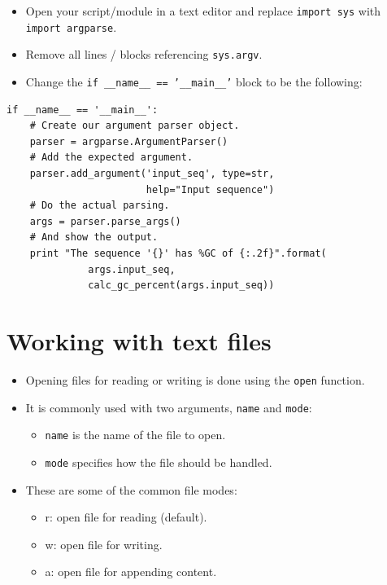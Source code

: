 \documentclass[aspectratio=1610,slidestop]{beamer}
\newenvironment{pythoncode}
 {\begin{tcolorbox}[title filled=false,
                    coltitle=LUMCDonkerblauw,
                    fonttitle=\scriptsize,
                    fontupper=\footnotesize,
                    enhanced,
                    drop small lifted shadow,
                    boxrule=0.1mm,
                    leftrule=5mm,
                    rulecolor=white,
                    left=0.1cm,
                    colback=white!92!black,
                    colframe=scriptback]}
 {\end{tcolorbox}}
\begin{document}
\begin{pframe}
 \vspace{-0.5cm}
 \begin{itemize}
  \item Open your script/module in a text editor and replace
  \texttt{import sys} with \texttt{import argparse}.
  \item Remove all lines / blocks referencing \texttt{sys.argv}.
  \item Change the \texttt{if __name__ == '__main__'} block to be
  the following:
 \end{itemize}
 \vspace{-0.3cm}
 \begin{pythoncode}
  \begin{verbatim}
if __name__ == '__main__':
    # Create our argument parser object.
    parser = argparse.ArgumentParser()
    # Add the expected argument.
    parser.add_argument('input_seq', type=str,
                        help="Input sequence")
    # Do the actual parsing.
    args = parser.parse_args()
    # And show the output.
    print "The sequence '{}' has %GC of {:.2f}".format(
              args.input_seq,
              calc_gc_percent(args.input_seq))
   \end{verbatim}
 \end{pythoncode}
\end{pframe}



\section{Working with text files}

\begin{pframe}
 \begin{itemize}
  \item Opening files for reading or writing is done using the
  \texttt{open} function.
  \item It is commonly used with two arguments, \texttt{name} and \texttt{mode}:
  \begin{itemize}
   \item \texttt{name} is the name of the file to open.
   \item \texttt{mode} specifies how the file should be handled.
  \end{itemize}
  \item These are some of the common file modes:
  \begin{itemize}
   \item r: open file for reading (default).
   \item w: open file for writing.
   \item a: open file for appending content.
  \end{itemize}
 \end{itemize}
\end{pframe}
\end{document}
